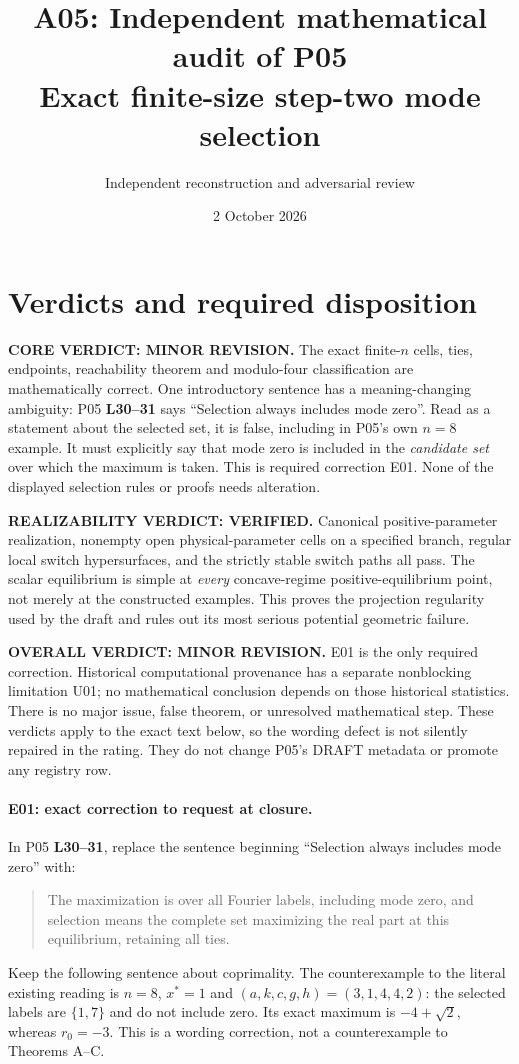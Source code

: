 \documentclass[11pt]{article}
\title{A05: Independent mathematical audit of P05\\Exact finite-size step-two mode selection}
\author{Independent reconstruction and adversarial review}
\date{2 October 2026}
\newcommand{\lin}[1]{\textbf{L#1}}
\begin{document}
\maketitle

\section{Verdicts and required disposition}
\textbf{CORE VERDICT: MINOR REVISION.}
The exact finite-$n$ cells, ties, endpoints, reachability theorem and
modulo-four classification are mathematically correct. One introductory
sentence has a meaning-changing ambiguity: P05 \lin{30--31} says
``Selection always includes mode zero''. Read as a statement about the
selected set, it is false, including in P05's own $n=8$ example. It must
explicitly say that mode zero is included in the \emph{candidate set}
over which the maximum is taken. This is required correction E01. None of
the displayed selection rules or proofs needs alteration.

\textbf{REALIZABILITY VERDICT: VERIFIED.}
Canonical positive-parameter realization, nonempty open physical-parameter
cells on a specified branch, regular local switch hypersurfaces, and the
strictly stable switch paths all pass. The scalar equilibrium is simple
at \emph{every} concave-regime positive-equilibrium point, not merely at
the constructed examples. This proves the projection regularity used by
the draft and rules out its most serious potential geometric failure.

\textbf{OVERALL VERDICT: MINOR REVISION.}
E01 is the only required correction. Historical computational provenance
has a separate nonblocking limitation U01; no mathematical conclusion
depends on those historical statistics. There is no major issue, false
theorem, or unresolved mathematical step. These verdicts apply to the
exact text below, so the wording defect is not silently repaired in the
rating. They do not change P05's DRAFT metadata or promote any registry row.

\paragraph{E01: exact correction to request at closure.}
In P05 \lin{30--31}, replace the sentence beginning ``Selection always
includes mode zero'' with:
\begin{quote}
The maximization is over all Fourier labels, including mode zero, and
selection means the complete set maximizing the real part at this
equilibrium, retaining all ties.
\end{quote}
Keep the following sentence about coprimality. The counterexample to the
literal existing reading is $n=8$, $x^*=1$ and
$(a,k,c,g,h)=(3,1,4,4,2)$: the selected labels are $\{1,7\}$ and do not
include zero. Its exact maximum is $-4+\sqrt2$, whereas $r_0=-3$.
This is a wording correction, not a counterexample to Theorems A--C.
\end{document}
